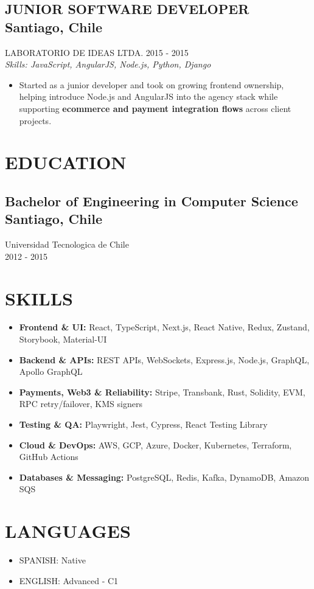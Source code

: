 \documentclass{article}
\newcommand{\SubHeading}[1]{
   \subsection*{#1}\vspace{-0.5em}
}
\newcommand{\WorkExperience}[2]{
   \subsection*{#1}
   \vspace{-1em}
   \uppercase{#2}
}
\newcommand{\Skills}[1]{
   \textit{Skills: #1}
}
\begin{document}
\WorkExperience{JUNIOR SOFTWARE DEVELOPER \hfill Santiago, Chile}{Laboratorio de Ideas Ltda. \hfill 2015 {-} 2015} \\
\Skills{JavaScript, AngularJS, Node.js, Python, Django}
\begin{itemize}
	\item Started as a junior developer and took on growing frontend ownership, helping introduce Node.js and AngularJS into the agency stack while supporting \textbf{ecommerce and payment integration flows} across client projects.
\end{itemize}

\section*{EDUCATION}
\SubHeading{Bachelor of Engineering in Computer Science \hfill Santiago, Chile}
Universidad Tecnologica de Chile \\[0.1em]
2012 {-} 2015

\section*{SKILLS}
\begin{itemize}
	\item \textbf{Frontend \& UI:} React, TypeScript, Next.js, React Native, Redux, Zustand, Storybook, Material-UI
	\item \textbf{Backend \& APIs:} REST APIs, WebSockets, Express.js, Node.js, GraphQL, Apollo GraphQL
	\item \textbf{Payments, Web3 \& Reliability:} Stripe, Transbank, Rust, Solidity, EVM, RPC retry/failover, KMS signers
	\item \textbf{Testing \& QA:} Playwright, Jest, Cypress, React Testing Library
	\item \textbf{Cloud \& DevOps:} AWS, GCP, Azure, Docker, Kubernetes, Terraform, GitHub Actions
	\item \textbf{Databases \& Messaging:} PostgreSQL, Redis, Kafka, DynamoDB, Amazon SQS
\end{itemize}

\section*{LANGUAGES}
\begin{itemize}[left=0pt]
	\item SPANISH: Native
	\item ENGLISH: Advanced {-} C1
\end{itemize}
\end{document}
